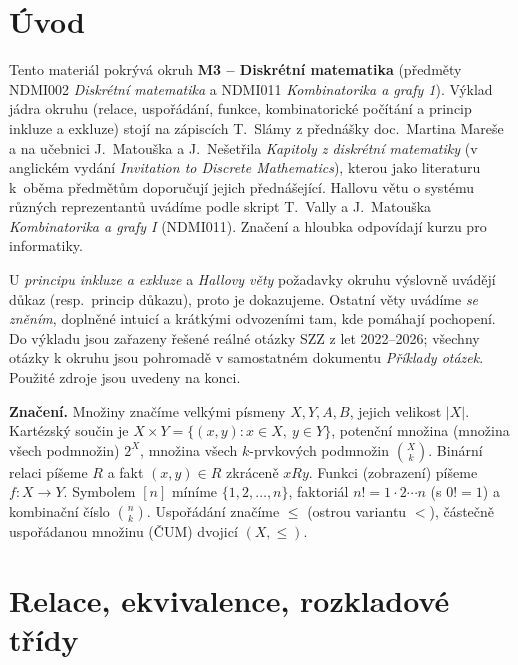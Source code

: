 \documentclass[11pt,a4paper]{article}
\begin{document}
\maketitle
\tableofcontents
\bigskip

\section*{Úvod}

Tento materiál pokrývá okruh \textbf{M3 -- Diskrétní matematika} (předměty NDMI002 \emph{Diskrétní matematika} a NDMI011 \emph{Kombinatorika a grafy 1}). Výklad jádra okruhu (relace, uspořádání, funkce, kombinatorické počítání a princip inkluze a exkluze) stojí na zápiscích T.~Slámy z přednášky doc.~Martina Mareše a na učebnici J.~Matouška a J.~Nešetřila \emph{Kapitoly z diskrétní matematiky} (v anglickém vydání \emph{Invitation to Discrete Mathematics}), kterou jako literaturu k~oběma předmětům doporučují jejich přednášející. Hallovu větu o systému různých reprezentantů uvádíme podle skript T.~Vally a J.~Matouška \emph{Kombinatorika a grafy I} (NDMI011). Značení a hloubka odpovídají kurzu pro informatiky.

U \emph{principu inkluze a exkluze} a \emph{Hallovy věty} požadavky okruhu výslovně uvádějí důkaz (resp.\ princip důkazu), proto je dokazujeme. Ostatní věty uvádíme \emph{se zněním}, doplněné intuicí a krátkými odvozeními tam, kde pomáhají pochopení. Do výkladu jsou zařazeny řešené reálné otázky SZZ z let 2022--2026; všechny otázky k okruhu jsou pohromadě v samostatném dokumentu \emph{Příklady otázek}. Použité zdroje jsou uvedeny na konci.

\medskip
\noindent\textbf{Značení.} Množiny značíme velkými písmeny $X,Y,A,B$, jejich velikost $|X|$. Kartézský součin je $X\times Y=\{(x,y):x\in X,\ y\in Y\}$, potenční množina (množina všech podmnožin) $2^X$, množina všech $k$-prvkových podmnožin $\binom{X}{k}$. Binární relaci píšeme $R$ a fakt $(x,y)\in R$ zkráceně $xRy$. Funkci (zobrazení) píšeme $f\colon X\to Y$. Symbolem $[n]$ míníme $\{1,2,\dots,n\}$, faktoriál $n!=1\cdot2\cdots n$ (s $0!=1$) a kombinační číslo $\binom{n}{k}$. Uspořádání značíme $\le$ (ostrou variantu $<$), částečně uspořádanou množinu (ČUM) dvojicí $(X,\le)$.

\section{Relace, ekvivalence, rozkladové třídy}
\end{document}
